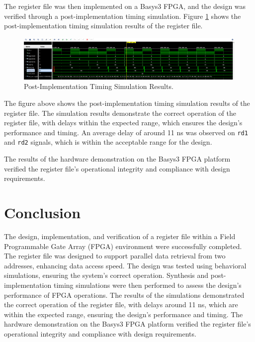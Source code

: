 \documentclass[CMPE]{../KGCOEReport}
\begin{document}
The register file was then implemented on a Basys3 FPGA, and the design was verified through a post-implementation timing simulation. Figure \ref{fig:implement} shows the post-implementation timing simulation results of the register file.

\begin{figure}[H]
    \centering
    \includegraphics[width=1\textwidth]{implement.png}
    \caption{Post-Implementation Timing Simulation Results.}
    \label{fig:implement}
\end{figure}

The figure above shows the post-implementation timing simulation results of the register file. The simulation results demonstrate the correct operation of the register file, with delays within the expected range, which ensures the design's performance and timing. An average delay of around 11 ns was observed on \verb|rd1| and \verb|rd2| signals, which is within the acceptable range for the design.

The results of the hardware demonstration on the Basys3 FPGA platform verified the register file's operational integrity and compliance with design requirements.

\section*{Conclusion}

The design, implementation, and verification of a register file within a Field Programmable Gate Array (FPGA) environment were successfully completed. The register file was designed to support parallel data retrieval from two addresses, enhancing data access speed. The design was tested using behavioral simulations, ensuring the system's correct operation. Synthesis and post-implementation timing simulations were then performed to assess the design's performance of FPGA operations. The results of the simulations demonstrated the correct operation of the register file, with delays around 11 ns, which are within the expected range, ensuring the design's performance and timing. The hardware demonstration on the Basys3 FPGA platform verified the register file's operational integrity and compliance with design requirements.
\end{document}
